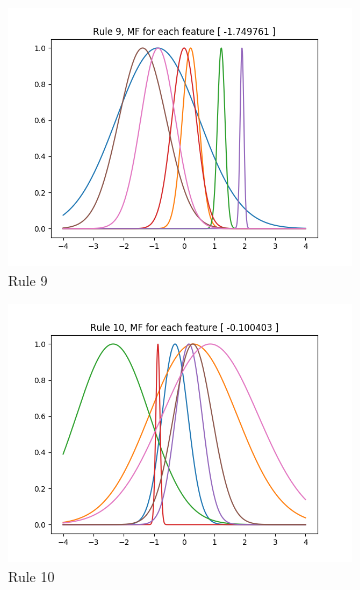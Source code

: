 \documentclass[11pt,a4paper]{article}
\begin{document}
\begin{figure}[htbp]
\begin{subfigure}{\columnwidth}
  \includegraphics[width=\columnwidth,keepaspectratio]{rule-9.png}  
  \caption{Rule 9}
  \label{fig:rules:rule-9}
\end{subfigure}
\begin{subfigure}{\columnwidth}
  \centering
  \includegraphics[width=\columnwidth,keepaspectratio]{rule-10.png}
  \caption{Rule 10}
  \label{fig:rules:rule-10}
\end{subfigure}
\begin{subfigure}{\columnwidth}
  \centering

\end{subfigure}
\end{figure}
\end{document}
